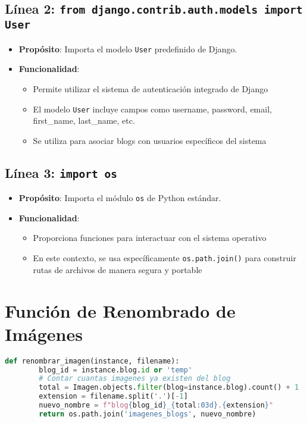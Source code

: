 \documentclass[12pt,a4paper]{article}
\begin{document}
	\subsection{Línea 2: \texttt{from django.contrib.auth.models import User}}
	\begin{itemize}
		\item \textbf{Propósito}: Importa el modelo \texttt{User} predefinido de Django.
		\item \textbf{Funcionalidad}: 
		\begin{itemize}
			\item Permite utilizar el sistema de autenticación integrado de Django
			\item El modelo \texttt{User} incluye campos como username, password, email, first\_name, last\_name, etc.
			\item Se utiliza para asociar blogs con usuarios específicos del sistema
		\end{itemize}
	\end{itemize}
	
	\subsection{Línea 3: \texttt{import os}}
	\begin{itemize}
		\item \textbf{Propósito}: Importa el módulo \texttt{os} de Python estándar.
		\item \textbf{Funcionalidad}: 
		\begin{itemize}
			\item Proporciona funciones para interactuar con el sistema operativo
			\item En este contexto, se usa específicamente \texttt{os.path.join()} para construir rutas de archivos de manera segura y portable
		\end{itemize}
	\end{itemize}
	
	\section{Función de Renombrado de Imágenes}
	
	\begin{lstlisting}[language=Python]
		def renombrar_imagen(instance, filename):
		blog_id = instance.blog.id or 'temp'
		# Contar cuantas imagenes ya existen del blog
		total = Imagen.objects.filter(blog=instance.blog).count() + 1
		extension = filename.split('.')[-1]
		nuevo_nombre = f"blog{blog_id}_{total:03d}.{extension}"
		return os.path.join('imagenes_blogs', nuevo_nombre)
	\end{lstlisting}
	
\end{document}
